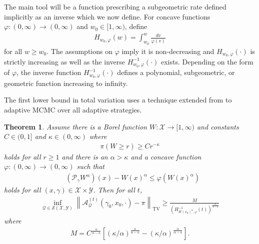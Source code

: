 \documentclass[12pt]{article}
\theoremstyle{plain}
\newtheorem{theorem}{Theorem}
\theoremstyle{remark}
\newcommand{\norm}[1]{\left\lVert#1\right\rVert}
\newcommand{\Q}{\mathcal{Q}}
\renewcommand{\P}{\mathcal{P}}
\newcommand{\A}{\mathcal{A}}
\newcommand{\X}{\mathcal{X}}
\newcommand{\Y}{\mathcal{Y}}
\renewcommand{\S}{\mathcal{S}}
\let\temp\phi
\let\phi\varphi
\let\varphi\temp
\newcommand{\eq}[1]{\begin{align*}#1\end{align*}}
\begin{document}
The main tool will be a function prescribing a subgeometric rate defined implicitly as an inverse which we now define.
For concave functions $\phi : (0, \infty) \to (0, \infty)$ and $w_0 \in [1, \infty)$, define
\begin{align}
H_{w_0, \phi}(w) = \int_{w_0}^w \frac{dv}{\phi(v)}
\end{align}
for all $w \ge w_0$.
The assumptions on $\phi$ imply it is non-decreasing and $H_{w_0, \phi}(\cdot)$ is strictly increasing as well as the inverse $H^{-1}_{w_0, \phi}(\cdot)$ exists.
Depending on the form of $\phi$, the inverse function $H^{-1}_{w_0, \phi}(\cdot)$ defines a polynomial, subgeometric, or geometric function increasing to infinity.

The first lower bound in total variation uses a technique extended from \citep[Corollary 3.7]{hairer:2009} to adaptive MCMC over all adaptive strategies.

\begin{theorem}
\label{theorem:lb_with_target_tails}
Assume there is a Borel function $W : \X \to [1, \infty)$ and constants $C \in (0, 1]$ and $\kappa \in (0, \infty)$ where
\begin{align}
\pi( W \ge r ) \ge C r^{-\kappa}
\label{eq:target_tail_lb}
\end{align}
holds for all $r \ge 1$ and there is an $\alpha > \kappa$ and a concave function $\phi : (0, \infty) \to (0, \infty)$ such that
\begin{align}
&(\P_\gamma W^{\alpha} )(x) - W(x)^\alpha  \le \phi( W(x)^\alpha )
\label{eq:lb_drift}
\end{align}
holds for all $(x, \gamma) \in \X \times \Y$.
Then for all $t$,
\eq{
\inf_{\Q \in \S(\X, \Y) } \norm{ \A_\Q^{(t)}(\gamma_0, x_0, \cdot) - \pi }_{\text{TV}}
\ge \frac{M}{ \left( H_{W(x_0)^\alpha, \phi}^{-1}(t) \right)^{\frac{\kappa}{\alpha - \kappa}}}
}
where 
\begin{align}
M = C^{\frac{\alpha}{\alpha - \kappa}} \left[ ( \kappa/\alpha )^{\frac{\kappa}{\alpha - \kappa}} - ( \kappa/\alpha )^{\frac{\alpha}{\alpha - \kappa}} \right].
\label{eq:M}
\end{align}
\end{theorem}
\end{document}
